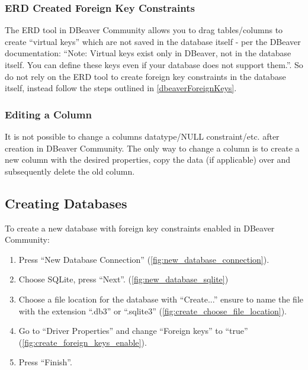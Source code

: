 \documentclass[a4paper,11pt,oneside]{article}
\begin{document}
\begin{sloppypar}
\subsubsection{ERD Created Foreign Key Constraints}
\label{dbeaverERDCreatedForeignKeys}
The ERD tool in DBeaver Community allows you to drag tables/columns to create ``virtual keys'' which are not saved in the database itself - per the DBeaver documentation:
``Note: Virtual keys exist only in DBeaver, not in the database itself. You can define these keys even if your database does not support them.''. \cite{dbeaver_virtual_keys} So do not rely on the ERD tool to create foreign key constraints in the database itself, instead follow the steps outlined in \autoref{dbeaverForeignKeys}.

\subsubsection{Editing a Column}
\label{dbeaverEditingColumn}
It is not possible to change a columns datatype/NULL constraint/etc. after creation in DBeaver Community. The only way to change a column is to create a new column with the desired properties, copy the data (if applicable) over and subsequently delete the old column.


\subsection{Creating Databases}
\label{dbeaverCreatingDatabase}
To create a new database with foreign key constraints enabled in DBeaver Community:
\begin{enumerate}
    \item Press ``New Database Connection'' (\autoref{fig:new_database_connection}).
    \item Choose SQLite, press ``Next''. (\autoref{fig:new_database_sqlite})
    \item Choose a file location for the database with ``Create...'' ensure to name the file with the extension ``.db3'' or ``.sqlite3'' (\autoref{fig:create_choose_file_location}).
    \item Go to ``Driver Properties'' and change ``Foreign keys'' to ``true'' (\autoref{fig:create_foreign_keys_enable}).
    \item Press ``Finish''.
\end{enumerate}


\end{sloppypar}
\end{document}
